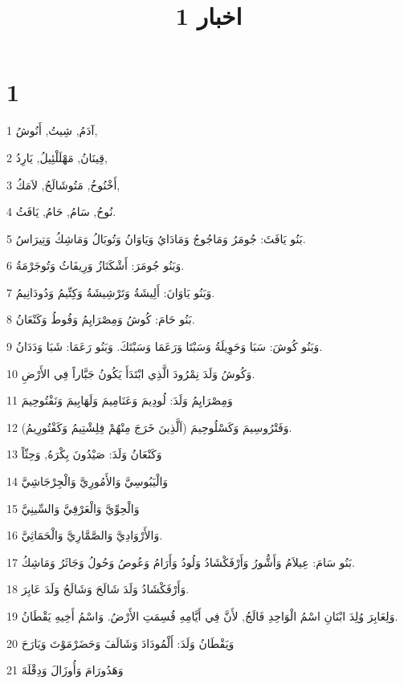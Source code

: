 

\title{1 اخبار}


\chapter{1}

\par 1 آدَمُ, شِيتُ, أَنُوشُ,
\par 2 قِينَانُ, مَهْلَلْئِيلُ, يَارِدُ,
\par 3 أَخْنُوخُ, مَتُوشَالَحُ, لاَمَكُ,
\par 4 نُوحُ, سَامُ, حَامُ, يَافَثُ.
\par 5 بَنُو يَافَثَ: جُومَرُ وَمَاجُوجُ وَمَادَايُ وَيَاوَانُ وَتُوبَالُ وَمَاشِكُ وَتِيرَاسُ.
\par 6 وَبَنُو جُومَرَ: أَشْكَنَازُ وَرِيفَاثُ وَتُوجَرْمَةُ.
\par 7 وَبَنُو يَاوَانَ: أَلِيشَةُ وَتَرْشِيشَةُ وَكِتِّيمُ وَدُودَانِيمُ.
\par 8 بَنُو حَامَ: كُوشُ وَمِصْرَايِمُ وَفُوطُ وَكَنْعَانُ.
\par 9 وَبَنُو كُوشَ: سَبَا وَحَوِيلَةُ وَسَبْتَا وَرَعَمَا وَسَبْتَكَ. وَبَنُو رَعَمَا: شَبَا وَدَدَانُ.
\par 10 وَكُوشُ وَلَدَ نِمْرُودَ الَّذِي ابْتَدَأَ يَكُونُ جَبَّاراً فِي الأَرْضِ.
\par 11 وَمِصْرَايِمُ وَلَدَ: لُودِيمَ وَعَنَامِيمَ وَلَهَابِيمَ وَنَفْتُوحِيمَ
\par 12 وَفَتْرُوسِيمَ وَكَسْلُوحِيمَ (اَلَّذِينَ خَرَجَ مِنْهُمْ فِلِشْتِيمُ وَكَفْتُورِيمُ).
\par 13 وَكَنْعَانُ وَلَدَ: صَيْدُونَ بِكْرَهُ, وَحِثّاً
\par 14 وَالْيَبُوسِيَّ وَالأَمُورِيَّ وَالْجِرْجَاشِيَّ
\par 15 وَالْحِوِّيَّ وَالْعَرْقِيَّ وَالسِّينِيَّ
\par 16 وَالأَرْوَادِيَّ وَالصَّمَّارِيَّ وَالْحَمَاثِيَّ.
\par 17 بَنُو سَامَ: عِيلاَمُ وَأَشُّورُ وَأَرْفَكْشَادُ وَلُودُ وَأَرَامُ وَعُوصُ وَحُولُ وَجَاثَرُ وَمَاشِكُ.
\par 18 وَأَرْفَكْشَادُ وَلَدَ شَالَحَ وَشَالَحُ وَلَدَ عَابِرَ.
\par 19 وَلِعَابِرَ وُلِدَ ابْنَانِ اسْمُ الْوَاحِدِ فَالَجُ, لأَنَّ فِي أَيَّامِهِ قُسِمَتِ الأَرْضُ. وَاسْمُ أَخِيهِ يَقْطَانُ.
\par 20 وَيَقْطَانُ وَلَدَ: أَلْمُودَادَ وَشَالَفَ وَحَضَرْمَوْتَ وَيَارَحَ
\par 21 وَهَدُورَامَ وَأُوزَالَ وَدِقْلَةَ
